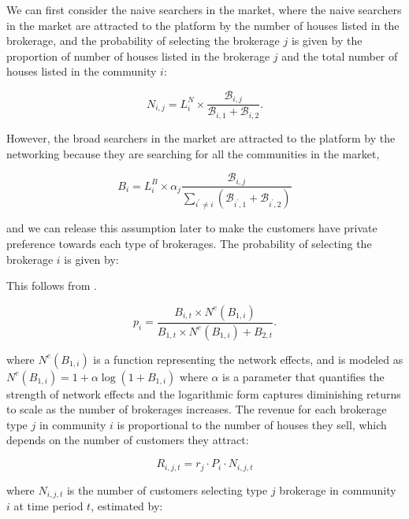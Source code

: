 \documentclass[12pt]{article}
\begin{document}
We can first consider the naive searchers in the market, where the naive searchers in the market are attracted to the platform by the number of houses listed in the brokerage, and the probability of selecting the brokerage $j$ is given by the proportion of number of houses listed in the brokerage $j$ and the total number of houses listed in the community $i$:

\begin{equation}
  N_{i, j} = L^N_i \times \frac{\mathcal{B}_{i, j}}{\mathcal{B}_{i, 1} + \mathcal{B}_{i, 2}}. \label{eq:naive_prob}
\end{equation}

However, the broad searchers in the market are attracted to the platform by the networking because they are searching for all the communities in the market,

\begin{equation}
  B_i = L^B_i \times \alpha_j \frac{\mathcal{B}_{i, j}}{\sum_{i^\prime \neq i} (\mathcal{B}_{i^\prime, 1} + \mathcal{B}_{i^\prime, 2})} \label{eq:broad_prob}
\end{equation}

and we can release this assumption later to make the customers have private preference towards each type of brokerages. The probability of selecting the brokerage $i$ is given by:

This follows from \citep{Armstrong2006}. 


\begin{equation}
  p_i = \frac{B_{i, t} \times N^e(B_{1, i})}{B_{1, t} \times N^e(B_{1, i}) + B_{2, t}}. \label{eq:prob}
\end{equation}

where $N^e(B_{1, i})$ is a function representing the network effects, and is modeled as $N^e(B_{1, i}) = 1 + \alpha \log(1 + B_{1, i})$ where $\alpha$ is a parameter that quantifies the strength of network effects and the logarithmic form captures diminishing returns to scale as the number of brokerages increases. The revenue for each brokerage type $j$ in community $i$ is proportional to the number of houses they sell, which depends on the number of customers they attract: 

\begin{equation}
  R_{i, j, t} = r_j \cdot P_i \cdot N_{i, j, t}
\end{equation}

where $N_{i, j, t}$ is the number of customers selecting type $j$ brokerage in community $i$ at time period $t$, estimated by:
\end{document}
